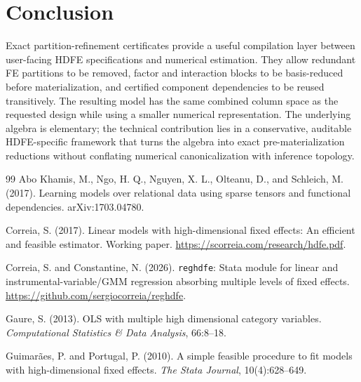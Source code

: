 \documentclass[11pt]{article}
\theoremstyle{definition}
\newcommand{\1}{\mathbf{1}}
\begin{document}
\section{Conclusion}

Exact partition-refinement certificates provide a useful compilation layer between user-facing HDFE specifications and numerical estimation. They allow redundant FE partitions to be removed, factor and interaction blocks to be basis-reduced before materialization, and certified component dependencies to be reused transitively. The resulting model has the same combined column space as the requested design while using a smaller numerical representation. The underlying algebra is elementary; the technical contribution lies in a conservative, auditable HDFE-specific framework that turns the algebra into exact pre-materialization reductions without conflating numerical canonicalization with inference topology.

\begin{thebibliography}{99}
Abo Khamis, M., Ngo, H. Q., Nguyen, X. L., Olteanu, D., and Schleich, M. (2017). Learning models over relational data using sparse tensors and functional dependencies. arXiv:1703.04780.

Correia, S. (2017). Linear models with high-dimensional fixed effects: An efficient and feasible estimator. Working paper. \url{https://scorreia.com/research/hdfe.pdf}.

Correia, S. and Constantine, N. (2026). \texttt{reghdfe}: Stata module for linear and instrumental-variable/GMM regression absorbing multiple levels of fixed effects. \url{https://github.com/sergiocorreia/reghdfe}.

Gaure, S. (2013). OLS with multiple high dimensional category variables. \emph{Computational Statistics \& Data Analysis}, 66:8--18.

Guimar\~aes, P. and Portugal, P. (2010). A simple feasible procedure to fit models with high-dimensional fixed effects. \emph{The Stata Journal}, 10(4):628--649.
\end{thebibliography}
\end{document}
